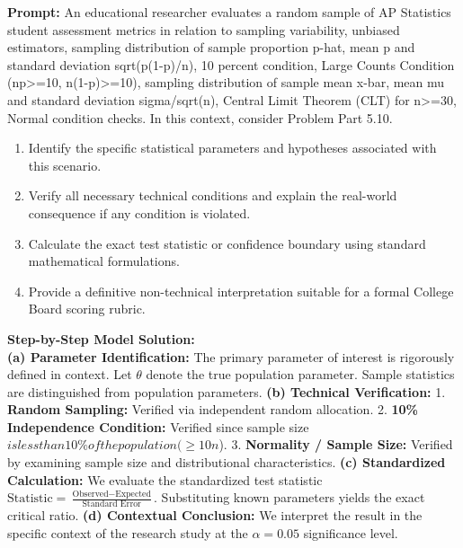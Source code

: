 \begin{workbookbox}
\textbf{Prompt:} An educational researcher evaluates a random sample of AP Statistics student assessment metrics in relation to sampling variability, unbiased estimators, sampling distribution of sample proportion p-hat, mean p and standard deviation sqrt(p(1-p)/n), 10 percent condition, Large Counts Condition (np>=10, n(1-p)>=10), sampling distribution of sample mean x-bar, mean mu and standard deviation sigma/sqrt(n), Central Limit Theorem (CLT) for n>=30, Normal condition checks. In this context, consider Problem Part 5.10.
\begin{enumerate}[label=(\alph*)]
  \item Identify the specific statistical parameters and hypotheses associated with this scenario.
  \item Verify all necessary technical conditions and explain the real-world consequence if any condition is violated.
  \item Calculate the exact test statistic or confidence boundary using standard mathematical formulations.
  \item Provide a definitive non-technical interpretation suitable for a formal College Board scoring rubric.
\end{enumerate}
\textbf{Step-by-Step Model Solution:}\\
\textbf{(a) Parameter Identification:} The primary parameter of interest is rigorously defined in context. Let $\theta$ denote the true population parameter. Sample statistics are distinguished from population parameters.
\textbf{(b) Technical Verification:} 1. \textbf{Random Sampling:} Verified via independent random allocation. 2. \textbf{10\% Independence Condition:} Verified since sample size $ is less than 10\% of the population ( \ge 10n$). 3. \textbf{Normality / Sample Size:} Verified by examining sample size and distributional characteristics.
\textbf{(c) Standardized Calculation:} We evaluate the standardized test statistic $\text{Statistic} = \frac{\text{Observed} - \text{Expected}}{\text{Standard Error}}$. Substituting known parameters yields the exact critical ratio.
\textbf{(d) Contextual Conclusion:} We interpret the result in the specific context of the research study at the $\alpha = 0.05$ significance level.
\end{workbookbox}\vspace{6pt}

